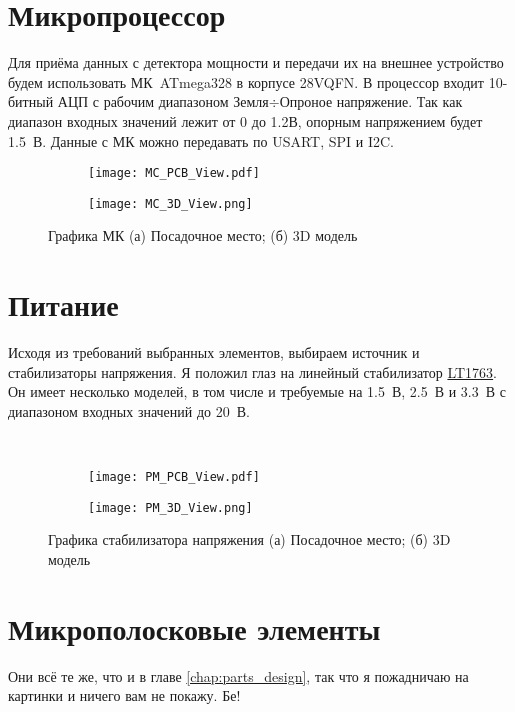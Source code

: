 \section{Микропроцессор}

Для приёма данных с детектора мощности и передачи их на внешнее устройство будем использовать МК~ATmega328 в корпусе 28VQFN. В процессор входит 10-битный АЦП с рабочим диапазоном Земля$\div$Опроное напряжение. Так как диапазон входных значений лежит от 0 до 1.2В, опорным напряжением будет 1.5~В. Данные с МК можно передавать по USART, SPI и I2C.


\begin{figure}[H]
	\centering
	\begin{subfigure}[b]{0.45\textwidth}
		\centering
		\texttt{[image: MC\_PCB\_View.pdf]}
		\caption{}%
		\label{fig:MC_PCB_View}
	\end{subfigure}
	\hfill
	\begin{subfigure}[b]{0.45\textwidth}
		\centering
		\texttt{[image: MC\_3D\_View.png]}
		\caption{}%
		\label{fig:MC_3D_View}
	\end{subfigure}
	\caption{%
		Графика МК
		(а) Посадочное место;
		(б) 3D модель
	}%
	\label{fig:MC_footprint}
\end{figure}

\section{Питание}

Исходя из требований выбранных элементов, выбираем источник и стабилизаторы напряжения. Я положил глаз на линейный стабилизатор \href{https://www.analog.com/ru/products/lt1763.html}{LT1763}. Он имеет несколько моделей, в том числе и требуемые на 1.5~В, 2.5~В и 3.3~В с диапазоном входных значений до 20~В.

\begin{figure}[H]
	\centering\
	\begin{subfigure}[b]{0.45\textwidth}
		\centering
		\texttt{[image: PM\_PCB\_View.pdf]}
		\caption{}%
		\label{fig:PM_PCB_View}
	\end{subfigure}
	\hfill
	\begin{subfigure}[b]{0.45\textwidth}
		\centering
		\texttt{[image: PM\_3D\_View.png]}
		\caption{}%
		\label{fig:PM_3D_View}
	\end{subfigure}
	\caption{%
		Графика стабилизатора напряжения
		(а) Посадочное место;
		(б) 3D модель
	}%
	\label{fig:PM_footprint}
\end{figure}

\section*{Микрополосковые элементы}

Они всё те же, что и в главе \ref{chap:parts_design}, так что я пожадничаю на картинки и ничего вам не покажу. Бе!


